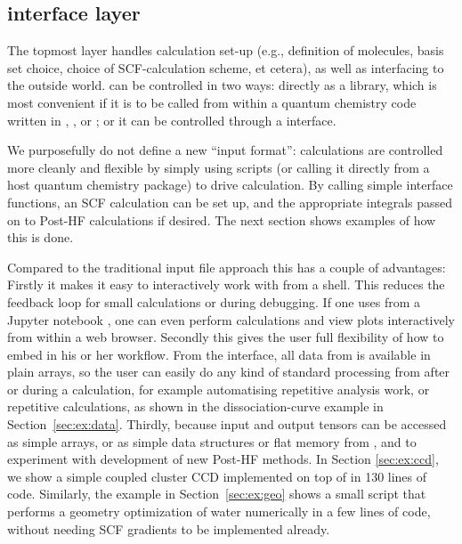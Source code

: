 %
%
\subsection{\molsturm interface layer}


The topmost \molsturm layer handles calculation set-up 
(e.g., definition of molecules, basis set choice, choice 
of SCF-calculation scheme, et cetera), as well as interfacing 
to the outside world. \molsturm can be controlled in two ways: 
directly as a \cpp library, which is most convenient if it is to 
be called from within a quantum chemistry code written in \cee, \cpp, 
or \fortran; or it can be controlled through a \python interface.

We purposefully do not define a new ``input format'': calculations are 
controlled more cleanly and flexible by simply using
\python scripts (or calling it directly from a host quantum 
chemistry package) to drive calculation.
By calling simple interface functions, an SCF calculation can be set
up, and the appropriate integrals passed on to Post-HF calculations
if desired. The next section shows examples of how this is done.

Compared to the traditional input file approach this has
a couple of advantages:
%
Firstly it makes it easy to interactively work with \molsturm
from a shell. This reduces the feedback loop for small calculations
or during debugging.  If one uses \molsturm from a Jupyter notebook \cite{Jupyter},
one can even perform calculations and view plots interactively from within a web browser.
%
Secondly this gives the user full flexibility
of how to embed \molsturm in his or her workflow.
From the \python interface, all data from \molsturm is available
in plain \numpy arrays, so the user can easily do
any kind of standard processing from \python
after or during a calculation, for example
automatising repetitive analysis work, or repetitive calculations,
as shown in the dissociation-curve example in Section~\ref{sec:ex:data}.
%
Thirdly, because input and output tensors can be accessed as simple
\numpy arrays, or as simple data structures or flat memory from \cpp,
and to experiment with development of new Post-HF methods.
In Section \ref{sec:ex:ccd}, we show a simple coupled cluster CCD
implemented on top of \molsturm in 130 lines of \numpy code.
Similarly, the example in Section~\ref{sec:ex:geo} shows a small
\python script that performs a geometry optimization of water 
numerically in a few lines of code, without needing SCF gradients 
to be implemented already.

